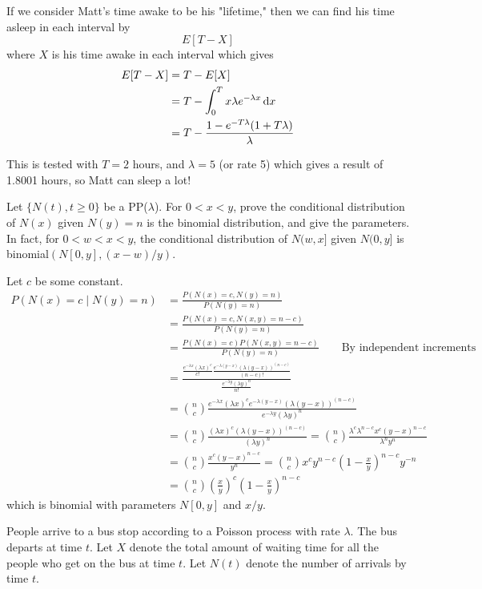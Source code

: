 \documentclass[10pt,a4paper]{exam}
\begin{document}
\begin{questions}
\begin{solution}
If we consider Matt's time awake to be his "lifetime," then we can find his time asleep in each interval by
$$E[T - X]$$ where $X$ is his time awake in each interval which gives
\begin{align*}
E[T - X]		&= T - E[X]\\
				&= T - \int_0^T x \lambda e^{-\lambda x} \dif x\\
				&= T - \frac{1 - e^{-T\lambda}(1 + T\lambda)}{\lambda}
\end{align*}

This is tested with $T = 2$ hours, and $\lambda = 5$ (or rate 5) which gives a result of 1.8001 hours, so Matt can sleep a lot! 
\end{solution}

\question Let $\{N(t), t \geq 0\}$ be a PP($\lambda$). For $0 < x < y$, prove the conditional distribution of $N(x)$ given $N(y) = n$ is the binomial distribution, and give the parameters. In fact, for $0 < w < x < y$, the conditional distribution of $N(w, x]$ given $N(0, y]$ is binomial$(N[0,y], (x-w)/y)$.

\begin{solution}
Let $c$ be some constant.
\begin{align*}
P(N(x) = c \mid N(y) = n)				&= \frac{P(N(x) = c, N(y) = n)}{P(N(y) = n)}\\
													&=  \frac{P(N(x) = c, N(x,y) = n-c)}{P(N(y) = n)}\\
													&= \frac{P(N(x) = c)P(N(x,y) = n-c)}{P(N(y) = n)} \quad \quad \text{By independent increments}\\
													&= \frac{\frac{e^{-\lambda x} (\lambda x)^c}{c!}  \frac{e^{-\lambda (y-x)} (\lambda (y-x))^{(n-c)}}{(n-c)!}}{\frac{e^{-\lambda y} (\lambda y)^n}{n!}}\\
													&= \binom{n}{c} \frac{e^{-\lambda x} (\lambda x)^ce^{-\lambda (y-x)} (\lambda (y-x))^{(n-c)}}{e^{-\lambda y} (\lambda y)^n}\\
													&= \binom{n}{c}\frac{ (\lambda x)^c (\lambda (y-x))^{(n-c)}}{(\lambda y)^n} = \binom{n}{c} \frac{\lambda^c \lambda^{n-c} x^c (y-x)^{n-c}}{\lambda^n y^n}\\
													&= \binom{n}{c} \frac{x^c (y-x)^{n-c}}{y^n} = \binom{n}{c} x^c y^{n-c}\left(1 - \frac{x}{y}\right)^{n-c}  y^{-n}\\
													&= \binom{n}{c} \left(\frac{x}{y}\right)^c \left(1 - \frac{x}{y}\right)^{n-c}
\end{align*}
which is binomial with parameters $N[0,y]$ and $x/y$.
\end{solution}
\pagebreak
\question People arrive to a bus stop according to a Poisson process with rate $\lambda$. The bus departs at time $t$. Let $X$ denote the total amount of waiting time for all the people who get on the bus at time $t$. Let $N(t)$ denote the number of arrivals by time $t$.


\end{questions}
\end{document}
